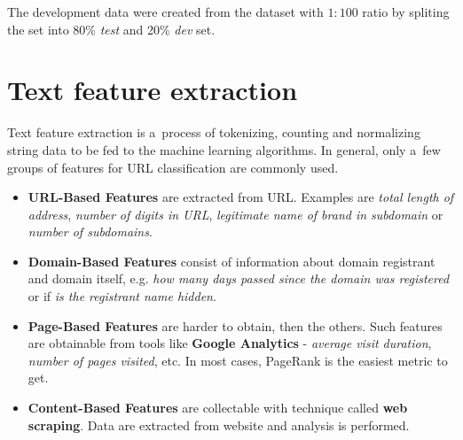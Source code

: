 \begin{table}[htb]
    \centering


    \caption{Dataset example}
    \label{table:dataset-example}
\end{table}
\FloatBarrier

The development data were created from the dataset with \( 1:100 \) ratio by spliting the set into 80\% \textit{test} and 20\% \textit{dev} set.

\section{Text feature extraction}\label{sec:text-feature-extraction}

Text feature extraction is a~process of tokenizing, counting and normalizing string data to be fed to the machine learning algorithms.
In general, only a~few groups of features for URL classification are commonly used.

\begin{itemize}
    \item \textbf{URL-Based Features} are extracted from URL\@.
    Examples are \textit{total length of address}, \textit{number of digits in URL}, \textit{legitimate name of brand in subdomain} or \textit{number of subdomains}.

    \item \textbf{Domain-Based Features} consist of information about domain registrant and domain itself, e.g. \textit{how many days passed since the domain was registered} or if \textit{is the registrant name hidden}.

    \item \textbf{Page-Based Features} are harder to obtain, then the others.
    Such features are obtainable from tools like \textbf{Google Analytics} - \textit{average visit duration}, \textit{number of pages visited}, etc.
    In most cases, PageRank is the easiest metric to get.

    \item \textbf{Content-Based Features} are collectable with technique called \textbf{web scraping}.
    Data are extracted from website and analysis is performed.
\end{itemize}

